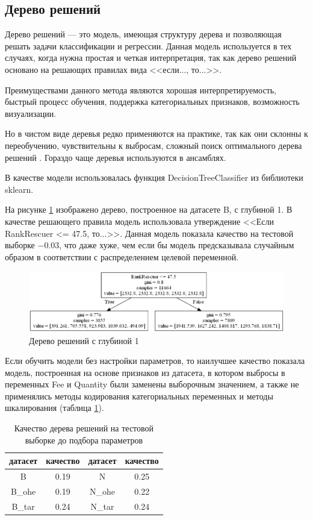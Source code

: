 \documentclass[14pt]{mmcs_article}
\begin{document}
\subsection{Дерево решений}

Дерево решений --- это модель, имеющая структуру дерева и позволяющая решать задачи классификации и регрессии. Данная модель используется в тех случаях, когда нужна простая и четкая интерпретация, так как дерево решений основано на решающих правилах вида <<если..., то...>>. 
 
Преимуществами данного метода являются хорошая интерпретируемость, быстрый процесс обучения, поддержка категориальных признаков, возможность визуализации.

Но в чистом виде деревья редко применяются на практике, так как они склонны к переобучению, чувствительны к выбросам, сложный поиск оптимального дерева решений \cite{lib:trees}. Гораздо чаще деревья используются в ансамблях.

В качестве модели использовалась функция DecisionTreeClassifier из библиотеки sklearn.

На рисунке \ref{models:tree} изображено дерево, построенное на датасете B, с глубиной 1. В качестве решающего правила модель использовала утверждение <<Если RankRescuer <= 47.5, то...>>. Данная модель показала качество на тестовой выборке $-0.03$, что даже хуже, чем если бы модель предсказывала случайным образом в соответствии с распределением целевой переменной.

\begin{figure}[H]
	\centering
	\includegraphics[scale=0.7]{tree.png}
	\caption{Дерево решений с глубиной 1}\label{models:tree}
\end{figure}

Если обучить модели без настройки параметров, то наилучшее качество показала модель, построенная на основе признаков из датасета, в котором выбросы в переменных Fee и Quantity были заменены выборочным значением, а также не применялись методы кодирования категориальных переменных и методы шкалирования (таблица \ref{models:table1}).

\begin{table}[H]
	\centering
	\caption{Качество дерева решений на тестовой выборке до подбора параметров}\label{models:table1}
	\begin{tabular}{cccc}
		\hline
		датасет & качество	& датасет & качество \\
		\hline
		B &	0.19 &	N &	0.25\\
		B\_ohe &	0.19 &	N\_ohe &	0.22\\
		B\_tar &	0.24 &	N\_tar &	0.24\\
		\hline
	\end{tabular}
\end{table}
\end{document}
